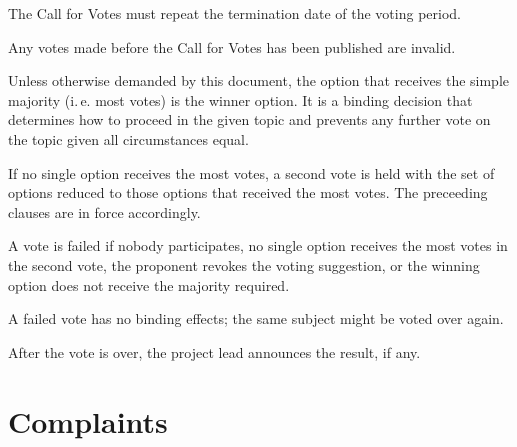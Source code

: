\documentclass[10pt,a4paper,DIV=calc,headings=medium,twocolumn,final]{scrartcl}
\newcommand\ie{i.\,e.\xspace}
\begin{document}
\begin{contract}
  The Call for Votes must repeat the termination date of the voting
  period.

  Any votes made before the Call for Votes has been published are
  invalid.


  Unless otherwise demanded by this document, the option that receives
  the simple majority (\ie most votes) is the winner option. It is a
  binding decision that determines how to proceed in the given topic
  and prevents any further vote on the topic given all circumstances
  equal.


  If no single option receives the most votes, a second vote is held
  with the set of options reduced to those options that received the
  most votes. The preceeding clauses are in force accordingly.

  \label{failedvote}

  A vote is failed if nobody participates, no single option receives
  the most votes in the second vote, the proponent revokes the
  voting suggestion, or the winning option does not receive the
  majority required.

  A failed vote has no binding effects; the same subject might be
  voted over again.


  After the vote is over, the project lead announces the result, if
  any.
\end{contract}

\section{Complaints}
\end{document}
